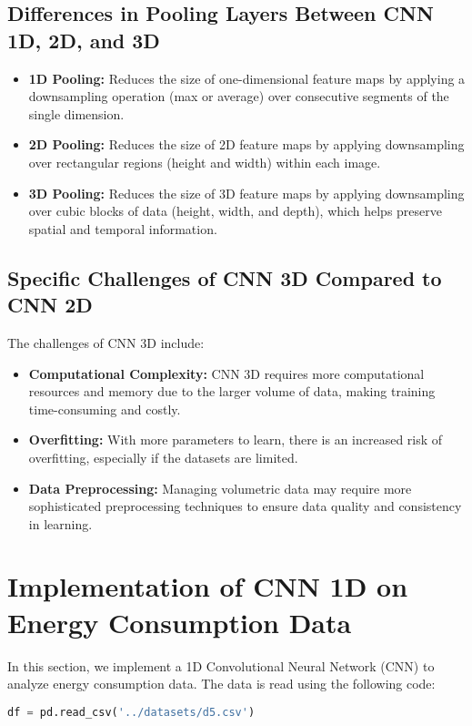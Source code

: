 \documentclass{article}
\begin{document}
\subsection{Differences in Pooling Layers Between CNN 1D, 2D, and 3D}
\begin{itemize}
    \item \textbf{1D Pooling:} Reduces the size of one-dimensional feature maps by applying a downsampling operation (max or average) over consecutive segments of the single dimension.
    \item \textbf{2D Pooling:} Reduces the size of 2D feature maps by applying downsampling over rectangular regions (height and width) within each image.
    \item \textbf{3D Pooling:} Reduces the size of 3D feature maps by applying downsampling over cubic blocks of data (height, width, and depth), which helps preserve spatial and temporal information.
\end{itemize}

\subsection{Specific Challenges of CNN 3D Compared to CNN 2D}
The challenges of CNN 3D include:
\begin{itemize}
    \item \textbf{Computational Complexity:} CNN 3D requires more computational resources and memory due to the larger volume of data, making training time-consuming and costly.
    \item \textbf{Overfitting:} With more parameters to learn, there is an increased risk of overfitting, especially if the datasets are limited.
    \item \textbf{Data Preprocessing:} Managing volumetric data may require more sophisticated preprocessing techniques to ensure data quality and consistency in learning.
\end{itemize}

\newpage
\section{Implementation of CNN 1D on Energy Consumption Data}

In this section, we implement a 1D Convolutional Neural Network (CNN) to analyze energy consumption data. The data is read using the following code:

\begin{lstlisting}[language=Python,]
df = pd.read_csv('../datasets/d5.csv')
\end{lstlisting}
\end{document}
